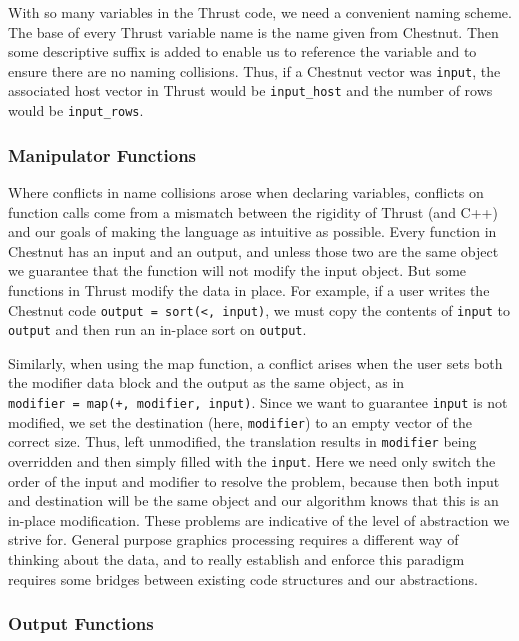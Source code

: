 \documentclass[twocolumn]{article}
\renewcommand{\|}{\origbar} %
\newcommand{\code}[1]{\texttt{#1}}
\begin{document}
With so many variables in the Thrust code, we need a convenient naming scheme. The base of every Thrust variable name is the name given from Chestnut. Then some descriptive suffix is added to enable us to reference the variable and to ensure there are no naming collisions. Thus, if a Chestnut vector was \code{input}, the associated host vector in Thrust would be \code{input\_host} and the number of rows would be \code{input\_rows}.

\subsubsection{Manipulator Functions}


Where conflicts in name collisions arose when declaring variables, conflicts on function calls come from a mismatch between the rigidity of Thrust (and C++) and our goals of making the language as intuitive as possible. Every function in Chestnut has an input and an output, and unless those two are the same object we guarantee that the function will not modify the input object. But some functions in Thrust modify the data in place. For example, if a user writes the Chestnut code \code{output~=~sort(<,~input)}, we must copy the contents of \code{input} to \code{output} and then run an in-place sort on \code{output}. 

Similarly, when using the map function, a conflict arises when the user sets both the modifier data block and the output as the same object, as in \code{modifier~=~map(+,~modifier,~input)}. Since we want to guarantee \code{input} is not modified, we set the destination (here, \code{modifier}) to an empty vector of the correct size. Thus, left unmodified, the translation results in \code{modifier} being overridden and then simply filled with the \code{input}. Here we need only switch the order of the input and modifier to resolve the problem, because then both input and destination will be the same object and our algorithm knows that this is an in-place modification. These problems are indicative of the level of abstraction we strive for. General purpose graphics processing requires a different way of thinking about the data, and to really establish and enforce this paradigm requires some bridges between existing code structures and our abstractions.

\subsubsection{Output Functions}
\end{document}
